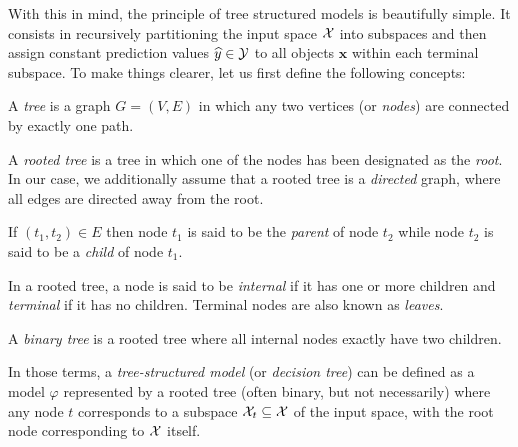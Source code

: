 With this in mind, the principle of tree structured models is beautifully
simple. It consists in recursively partitioning the input space ${\cal X}$ into
subspaces and then assign constant prediction values $\widehat{y}\in{\cal Y}$ to all objects
$\mathbf{x}$ within each terminal subspace. To make things clearer, let us first define
the following concepts:

\begin{definition}
A \emph{tree} is a graph $G=(V,E)$ in which any two vertices (or \emph{nodes})
are connected by exactly one path.
\end{definition}

\begin{definition}
A \emph{rooted tree} is a tree in which one of the nodes has been designated as
the \emph{root}. In our case, we additionally assume that a rooted tree is a
\emph{directed} graph, where all edges are directed away from the root.
\end{definition}

\begin{definition}
If $(t_1, t_2)\in E$ then node $t_1$ is said to be the \emph{parent} of
node $t_2$ while node $t_2$ is said to be a \emph{child} of node $t_1$.
\end{definition}

\begin{definition}
In a rooted tree, a node is said to be \emph{internal} if it has one or more
children and \emph{terminal} if it has no children. Terminal nodes are also
known as \emph{leaves}.
\end{definition}

\begin{definition}
A \emph{binary tree} is a rooted tree where all internal nodes exactly
have two children.
\end{definition}

In those terms, a \textit{tree-structured model} (or \textit{decision tree})
can be defined as a model $\varphi$ represented by a rooted tree (often binary,
but not necessarily) where any node $t$ corresponds to a subspace ${\cal X}_t
\subseteq {\cal X}$ of the input space, with the root node corresponding to
${\cal X}$ itself.





